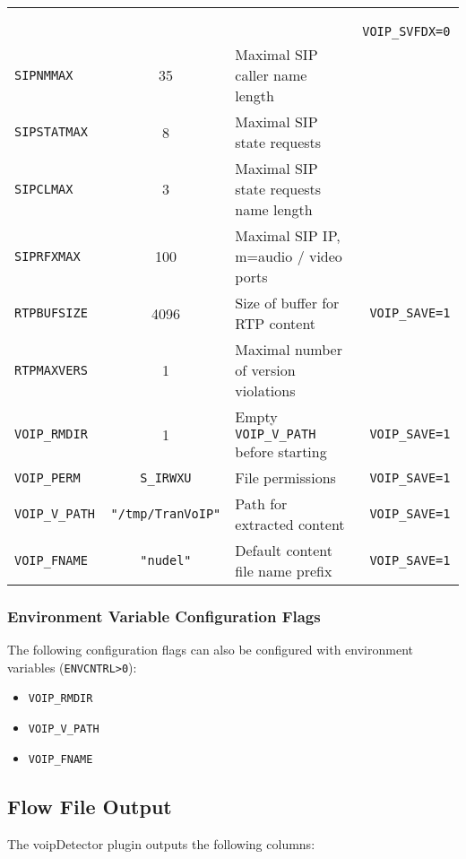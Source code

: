 \documentclass[documentation]{subfiles}
\begin{document}
\begin{longtable}{>{\tt}lcl>{\tt\small}l}
                   &      &                                                                    & VOIP\_SVFDX=0\\
    SIPNMMAX       &   35 & Maximal SIP caller name length                                     & \\
    SIPSTATMAX     &    8 & Maximal SIP state requests                                         & \\
    SIPCLMAX       &    3 & Maximal SIP state requests name length                             & \\
    SIPRFXMAX      &  100 & Maximal SIP IP, m=audio / video ports                              & \\
    RTPBUFSIZE     & 4096 & Size of buffer for RTP content                                     & VOIP\_SAVE=1\\
    RTPMAXVERS     &    1 &  Maximal number of version violations                              & \\
    VOIP\_RMDIR    &    1 & Empty {\tt\small VOIP\_V\_PATH} before starting                    & VOIP\_SAVE=1\\
    VOIP\_PERM     & {\tt\small S\_IRWXU}
                          & File permissions                                                   & VOIP\_SAVE=1\\
    VOIP\_V\_PATH  & {\tt\small "/tmp/TranVoIP"}
                          & Path for extracted content                                         & VOIP\_SAVE=1\\
    VOIP\_FNAME    & {\tt\small "nudel"}
                          & Default content file name prefix                                   & VOIP\_SAVE=1\\
    \bottomrule
\end{longtable}

\subsubsection{Environment Variable Configuration Flags}
The following configuration flags can also be configured with environment variables ({\tt ENVCNTRL>0}):
\begin{itemize}
    \item {\tt VOIP\_RMDIR}
    \item {\tt VOIP\_V\_PATH}
    \item {\tt VOIP\_FNAME}
\end{itemize}

\subsection{Flow File Output}
The voipDetector plugin outputs the following columns:
\end{document}
